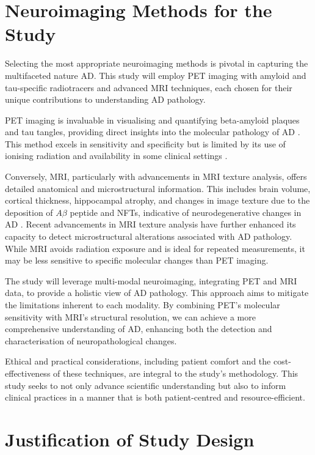 \documentclass[10pt]{article}
\begin{document}
\begin{sloppypar}
  \section{Neuroimaging Methods for the Study}
  \label{sec:neuroimaging-methods}

  Selecting the most appropriate neuroimaging methods is pivotal in capturing the multifaceted nature AD. This study will employ PET imaging with amyloid and tau-specific radiotracers and advanced MRI techniques, each chosen for their unique contributions to understanding AD pathology.

  PET imaging is invaluable in visualising and quantifying beta-amyloid plaques and tau tangles, providing direct insights into the molecular pathology of AD \citep{jack_serial_2009}. This method excels in sensitivity and specificity but is limited by its use of ionising radiation and availability in some clinical settings \citep{bao_pet_2021}.

  Conversely, MRI, particularly with advancements in MRI texture analysis, offers detailed anatomical and microstructural information. This includes brain volume, cortical thickness, hippocampal atrophy, and changes in image texture due to the deposition of $A\beta$ peptide and NFTs, indicative of neurodegenerative changes in AD \citep{cai_magnetic_2020}. Recent advancements in MRI texture analysis have further enhanced its capacity to detect microstructural alterations associated with AD pathology. While MRI avoids radiation exposure and is ideal for repeated measurements, it may be less sensitive to specific molecular changes than PET imaging.

  The study will leverage multi-modal neuroimaging, integrating PET and MRI data, to provide a holistic view of AD pathology. This approach aims to mitigate the limitations inherent to each modality. By combining PET’s molecular sensitivity with MRI’s structural resolution, we can achieve a more comprehensive understanding of AD, enhancing both the detection and characterisation of neuropathological changes.

  Ethical and practical considerations, including patient comfort and the cost-effectiveness of these techniques, are integral to the study’s methodology. This study seeks to not only advance scientific understanding but also to inform clinical practices in a manner that is both patient-centred and resource-efficient.

  \section{Justification of Study Design}
  \label{sec:justification-of-study-design}


\end{sloppypar}
\end{document}
